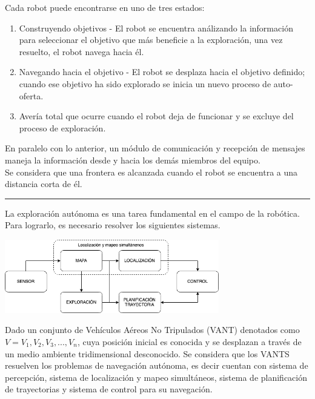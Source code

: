\documentclass[12pt]{article}
\begin{document}
Cada robot puede encontrarse en uno de tres estados:
\begin{enumerate}
\item Construyendo objetivos - El robot se encuentra análizando la información para seleccionar el objetivo que más beneficie a la exploración, una vez resuelto, el robot navega hacia él.
\item Navegando hacia el objetivo - El robot se desplaza hacia el objetivo definido; cuando ese objetivo ha sido explorado se inicia un nuevo proceso de auto-oferta.
\item Avería total que ocurre cuando el robot deja de funcionar y se excluye del proceso de exploración.
\end{enumerate}

En paralelo con lo anterior, un módulo de comunicación y recepción de mensajes maneja la información desde y hacia los demás miembros del equipo.\\

Se considera que una frontera es alcanzada cuando el robot se encuentra a una distancia corta de él.

\vspace{1cm}
\hrule
\vspace{1cm}

La exploración autónoma es una tarea fundamental en el campo de la robótica. Para lograrlo, es necesario resolver los siguientes sistemas.

\begin{center}
\includegraphics[width=0.7\textwidth]{exploracion}
\end{center}
\vspace{0.5cm}
Dado un conjunto de Vehículos Aéreos No Tripulados (VANT) denotados como $V = {V_{1}, V_{2}, V_{3},...,V_{n}}$, cuya posición inicial es conocida y se desplazan a través de un medio ambiente tridimensional desconocido. Se considera que los VANTS resuelven los problemas de navegación autónoma, es decir cuentan con sistema de percepción, sistema de localización y mapeo simultáneos, sistema de planificación de trayectorias y sistema de control para su navegación. \\
\end{document}
